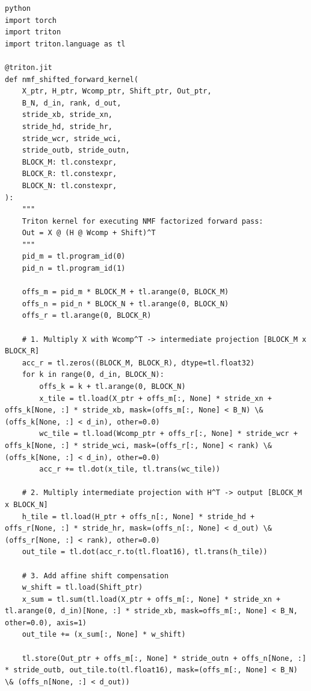\vspace{0.5em}
\begin{mdframed}[backgroundcolor=codebg, linecolor=codeframe, linewidth=1pt, roundcorner=4pt, innerleftmargin=2pt, innerrightmargin=5pt, innertopmargin=5pt, innerbottommargin=5pt]
\begin{lstlisting}
python
import torch
import triton
import triton.language as tl

@triton.jit
def nmf_shifted_forward_kernel(
    X_ptr, H_ptr, Wcomp_ptr, Shift_ptr, Out_ptr,
    B_N, d_in, rank, d_out,
    stride_xb, stride_xn,
    stride_hd, stride_hr,
    stride_wcr, stride_wci,
    stride_outb, stride_outn,
    BLOCK_M: tl.constexpr,
    BLOCK_R: tl.constexpr,
    BLOCK_N: tl.constexpr,
):
    """
    Triton kernel for executing NMF factorized forward pass:
    Out = X @ (H @ Wcomp + Shift)^T
    """
    pid_m = tl.program_id(0)
    pid_n = tl.program_id(1)

    offs_m = pid_m * BLOCK_M + tl.arange(0, BLOCK_M)
    offs_n = pid_n * BLOCK_N + tl.arange(0, BLOCK_N)
    offs_r = tl.arange(0, BLOCK_R)

    # 1. Multiply X with Wcomp^T -> intermediate projection [BLOCK_M x BLOCK_R]
    acc_r = tl.zeros((BLOCK_M, BLOCK_R), dtype=tl.float32)
    for k in range(0, d_in, BLOCK_N):
        offs_k = k + tl.arange(0, BLOCK_N)
        x_tile = tl.load(X_ptr + offs_m[:, None] * stride_xn + offs_k[None, :] * stride_xb, mask=(offs_m[:, None] < B_N) \& (offs_k[None, :] < d_in), other=0.0)
        wc_tile = tl.load(Wcomp_ptr + offs_r[:, None] * stride_wcr + offs_k[None, :] * stride_wci, mask=(offs_r[:, None] < rank) \& (offs_k[None, :] < d_in), other=0.0)
        acc_r += tl.dot(x_tile, tl.trans(wc_tile))

    # 2. Multiply intermediate projection with H^T -> output [BLOCK_M x BLOCK_N]
    h_tile = tl.load(H_ptr + offs_n[:, None] * stride_hd + offs_r[None, :] * stride_hr, mask=(offs_n[:, None] < d_out) \& (offs_r[None, :] < rank), other=0.0)
    out_tile = tl.dot(acc_r.to(tl.float16), tl.trans(h_tile))

    # 3. Add affine shift compensation
    w_shift = tl.load(Shift_ptr)
    x_sum = tl.sum(tl.load(X_ptr + offs_m[:, None] * stride_xn + tl.arange(0, d_in)[None, :] * stride_xb, mask=offs_m[:, None] < B_N, other=0.0), axis=1)
    out_tile += (x_sum[:, None] * w_shift)

    tl.store(Out_ptr + offs_m[:, None] * stride_outn + offs_n[None, :] * stride_outb, out_tile.to(tl.float16), mask=(offs_m[:, None] < B_N) \& (offs_n[None, :] < d_out))
\end{lstlisting}
\end{mdframed}
\vspace{0.5em}


